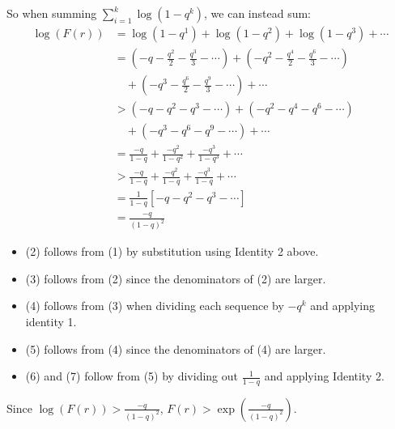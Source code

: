 \documentclass[11pt, oneside]{article} 	%
\begin{document}
So when summing $\sum_{i=1}^k \log(1-q^k)$, we can instead sum:
\begin{align}
\log(F(r)) &= \log(1-q^1) + \log(1-q^2) + \log(1-q^3) + \cdots \\
&= \left(-q - \frac{q^2}{2} - \frac{q^3}{3} - \cdots\right) + \left(-q^2 - \frac{q^4}{2} - \frac{q^6}{3} - \cdots\right) \nonumber \\
&\quad + \left(-q^3 - \frac{q^6}{2} - \frac{q^9}{3} - \cdots\right) + \cdots \\
&> \left(-q - q^2 - q^3 - \cdots\right) + \left(-q^2 - q^4 - q^6 - \cdots\right) \nonumber \\
&\quad + \left(-q^3 - q^6 - q^9 - \cdots\right) + \cdots \\
&= \frac{-q}{1-q} + \frac{-q^2}{1-q^2} + \frac{-q^3}{1-q^3} + \cdots \\
&> \frac{-q}{1-q} + \frac{-q^2}{1-q} + \frac{-q^3}{1-q} + \cdots \\
&= \frac{1}{1-q}\left[-q - q^2 - q^3 - \cdots\right] \\
&= \frac{-q}{(1-q)^2}
\end{align}

\begin{itemize}
\item (2) follows from (1) by substitution using Identity 2 above.
\item (3) follows from (2) since the denominators of (2) are larger.
\item (4) follows from (3) when dividing each sequence by $-q^k$  and applying identity 1.
\item (5) follows from (4) since the denominators of (4) are larger.
\item (6) and (7) follow from (5) by dividing out $\frac1{1-q}$ and applying Identity 2.
\end{itemize}

Since $\log(F(r))  > \frac{-q}{(1-q)^2}$, $F(r) > \exp (\frac{-q}{(1-q)^2})$.
\end{document}
